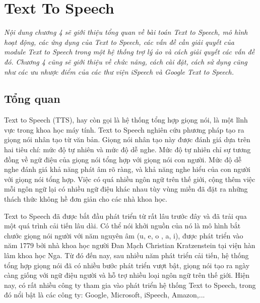 \chapter{Text To Speech}
\ifpdf
    \graphicspath{{Chapter4/Chapter4Figs/PNG/}{Chapter4/Chapter4Figs/PDF/}{Chapter4/Chapter4Figs/}}
\else
    \graphicspath{{Chapter4/Chapter4Figs/EPS/}{Chapter4/Chapter4Figs/}}
\fi
\textit{Nội dung chương 4 sẽ giới thiệu tổng quan về bài toán Text to Speech, mô hình hoạt động, các ứng dụng của Text to Speech, các vấn đề cần giải quyết của module Text to Speech trong một hệ thống trợ lý ảo và cách giải quyết các vấn đề đó. Chương 4 cũng sẽ giới thiệu về chức năng, cách cài đặt, cách sử dụng cũng như các ưu nhược điểm của các thư viện iSpeech và Google Text to Speech.}

\section{Tổng quan}
Text to Speech (TTS), hay còn gọi là hệ thống tổng hợp giọng nói,  là một lĩnh vực trong khoa học máy tính. Text to Speech nghiên cứu phương pháp tạo ra giọng nói nhân tạo từ văn bản. Giọng nói nhân tạo này được đánh giá dựa trên hai tiêu chí: mức độ tự nhiên và mức độ dễ nghe. Mức độ tự nhiên chỉ sự tương đồng về ngữ điệu của giọng nói tổng hợp với giọng nói con người. Mức độ dễ nghe đánh giá khả năng phát âm rõ ràng, và khả năng nghe hiểu của con người với giọng nói tổng hợp. Việc có quá nhiều ngôn ngữ trên thế giới, cộng thêm việc mỗi ngôn ngữ lại có nhiều ngữ điệu khác nhau tùy vùng miền đã đặt ra những thách thức không hề đơn giản cho các nhà khoa học.

Text to Speech đã được bắt đầu phát triển từ rất lâu trước đây và đã trải qua một quá trình cải tiến lâu dài. Có thể nói khởi nguồn của nó là mô hình bắt chước giọng nói người với năm nguyên âm (u, e, o , a, i), được phát triển vào năm 1779 bởi nhà khoa học người Đan Mạch Christian Kratzenstein tại viện hàn lâm khoa học Nga. Từ đó đến nay, sau nhiều năm phát triển cải tiến, hệ thống tổng hợp giọng nói đã có nhiều bước phát triển vượt bật, giọng nói tạo ra ngày càng giống với ngữ điệu người và hỗ trợ nhiều loại ngôn ngữ trên thế giới. Hiện nay, có rất nhiều công ty tham gia vào phát triển hệ thống Text to Speech, trong đó nổi bật là các công ty: Google, Microsoft, iSpeech, Amazon,...

